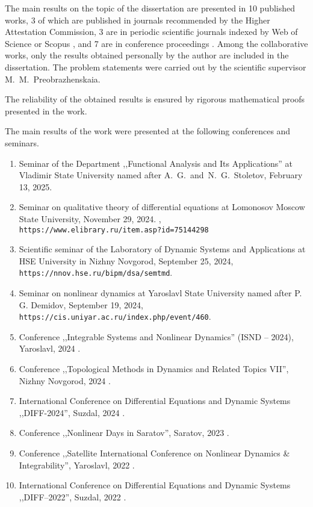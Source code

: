 The main results on the topic of the dissertation are presented in 10 published works, 3 of which \cite{wosbib1,wosbib2,scbib1} are published in journals recommended by the Higher Attestation Commission, 3 are in periodic scientific journals indexed by Web of Science or Scopus \cite{wosbib1,wosbib2,scbib1}, and 7 are in conference proceedings \cite{Sergeev2024,confbib1,confbib2,confbib3,confbib4,confbib5,confbib6}. Among the collaborative works, only the results obtained personally by the author are included in the dissertation. The problem statements were carried out by the scientific supervisor M.~M.~Preobrazhenskaia.

The reliability of the obtained results is ensured by rigorous mathematical proofs presented in the work.

\nocite{scbib1, wosbib1, wosbib2}

\bigskip

{\probation}
The main results of the work were presented at the following conferences and seminars.
\begin{enumerate}
	\item Seminar of the Department ,,Functional Analysis and Its Applications'' at Vladimir State University named after A.~G.~and~N.~G.~Stoletov, February 13, 2025.
	\item Seminar on qualitative theory of differential equations at Lomonosov Moscow State University, November 29, 2024. \cite{Sergeev2024},\\\texttt{https://www.elibrary.ru/item.asp?id=75144298}
	\item Scientific seminar of the Laboratory of Dynamic Systems and Applications at HSE University in Nizhny Novgorod, September 25, 2024,\\\texttt{https://nnov.hse.ru/bipm/dsa/semtmd}.
	\item Seminar on nonlinear dynamics at Yaroslavl State University named after P. G. Demidov, September 19, 2024,\\\texttt{https://cis.uniyar.ac.ru/index.php/event/460}.
	\item Conference ,,Integrable Systems and Nonlinear Dynamics'' (ISND – 2024), Yaroslavl, 2024 \cite{confbib5}.
	\item Conference ,,Topological Methods in Dynamics and Related Topics VII'', Nizhny Novgorod, 2024 \cite{confbib6}.
	\item International Conference on Differential Equations and Dynamic Systems ,,DIFF-2024'',  Suzdal, 2024 \cite{confbib3}.
	\item Conference ,,Nonlinear Days in Saratov'', Saratov, 2023 \cite{confbib2}.
	\item Conference ,,Satellite International Conference on Nonlinear Dynamics {\&} Integrability'', Yaroslavl, 2022 \cite{confbib4}.
	\item International Conference on Differential Equations and Dynamic Systems ,,DIFF--2022'', Suzdal, 2022 \cite{confbib1}.
\end{enumerate}

